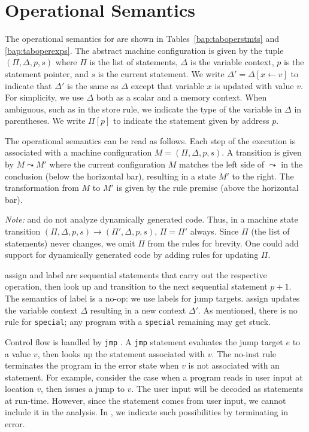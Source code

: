 \section{Operational Semantics}
\label{vine:operational}



The operational semantics for \bil are shown in
Tables~\ref{bap:taboperstmts} and \ref{bap:taboperexps}.  The abstract
machine configuration is given by the tuple $(\Pi, \Delta, p, s)$
where $\Pi$ is the list of statements, $\Delta$ is the variable
context, $p$ is the statement pointer, and $s$ is the current
statement.  We write $\Delta' = \Delta[x \leftarrow v]$ to indicate
that $\Delta'$ is the same as $\Delta$ except that variable $x$ is
updated with value $v$.  For simplicity, we use $\Delta$ both as a
scalar and a memory context. When ambiguous, such as in the {\sc
  store} rule, we indicate the type of the variable in $\Delta$ in
parentheses. We write $\Pi[p]$ to indicate the statement given by
address $p$.

The operational semantics can be read as follows.  Each step of the
execution is associated with a machine configuration $M = (\Pi,
\Delta, p, s)$.  A transition is given by $M \leadsto M'$ where the
current configuration $M$ matches the left side of $\leadsto$ in the
conclusion (below the horizontal bar), resulting in a state $M'$ to
the right.  The transformation from $M$ to $M'$ is given by the rule
premise (above the horizontal bar). 

{\it Note:} \bap and \bil do not analyze dynamically generated
code. Thus, in a machine state transition $(\Pi, \Delta, p, s)
\rightarrow (\Pi', \Delta, p, s)$, $\Pi = \Pi'$ always. Since $\Pi$
(the list of statements) never changes, we omit $\Pi$ from the rules
for brevity. One could add support for dynamically generated code by
adding rules for updating $\Pi$. 


{\sc assign} and {\sc label} are sequential statements that carry
out the respective operation, then look up and transition to the next
sequential statement $p+1$. The semantics of {\sc label} is a no-op:
we use labels for jump targets.  {\sc assign} updates the variable
context $\Delta$ resulting in a new context $\Delta'$.  As mentioned,
there is no rule for {\tt special}; any program with a {\tt special}
remaining may get stuck.

Control flow is handled by {\tt jmp}%
. A {\tt jmp} statement
evaluates the jump target $e$ to a value $v$, then looks up the
statement associated with $v$.  The {\sc no-inst} rule terminates
the program in the error state when $v$ is not associated with an
statement. For example, consider the case when a program reads in
user input at location $v$, then issues a jump to $v$.  The user input
will be decoded as statements at run-time.  However, since the
statement comes from user input, we cannot include it in the analysis. In
\bap, we indicate such possibilities by terminating in error.




%

